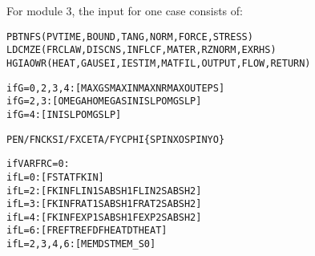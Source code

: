 \documentclass[12pt]{report}
\renewcommand{\magenta}[1]{}
\begin{document}
For module 3, the input for one case consists of:
\begin{alltt}\small
% Control integers, see section \ref{sec:controldigits}:

\magenta{ } PBTNFS      \magenta{        }       (PVTIME, BOUND , TANG  , NORM  , FORCE , STRESS)
\magenta{ } LDCMZE\magenta{  \{M\}   }             (FRCLAW, DISCNS, INFLCF, MATER , RZNORM, EXRHS \magenta{,
                                                                      MATER2})
\magenta{X}HGIAOWR     (\magenta{XFLOW , }HEAT  , GAUSEI, IESTIM, MATFIL, OUTPUT, FLOW  , RETURN)

\magenta{% Parameters for additional debug output

if X=1: [ PSFLCIN \{R\} ] (PROFIL, SMOOTH, FORCE, LOCATE, CPATCH, INFLCF, NMDBG,
                                                                        READLN)

}% Parameters for the iterative solution algorithms (section \ref{sec:iter_const}):

if G=0,2,3,4: [ MAXGS   MAXIN   MAXNR   MAXOUT  EPS     ]
if G=2,3:     [ OMEGAH  OMEGAS  INISLP  OMGSLP          ]
if G=4:       [ INISLP  OMGSLP                          ]
\magenta{if G=5:       [ FDECAY  BETATH  KDOWFB  D\_IFC   D\_LIN   D\_CNS   D\_SLP   POW\_S ]
}
% Kinematics description (section \ref{sec:kincns}):
% Note: PEN  is needed when N=0,      FN when N=1
%       CKSI is needed when F=0,      FX when F=1 or 2
%       CETA is needed when F=0 or 1, FY when F=2

PEN/FN  CKSI/FX  CETA/FY  CPHI   \{SPINXO   SPINYO\}

% Friction description (section \ref{sec:fric_dscrp}):
%      L=0 --> Coulomb friction with static/kinetic coefficients
%      L=2 --> velocity dependent friction with linear/const formula
%      L=3 --> velocity dependent friction with rational formula
%      L=4 --> velocity dependent friction with exponential formula
%      L=6 --> temperature dependent friction with piecewise linear formula

if VARFRC=0:
      if L=0: [ FSTAT  FKIN                                ]
      if L=2: [ FKIN   FLIN1  SABSH1  FLIN2  SABSH2        ]
      if L=3: [ FKIN   FRAT1  SABSH1  FRAT2  SABSH2        ]
      if L=4: [ FKIN   FEXP1  SABSH1  FEXP2  SABSH2        ]
      if L=6: [ FREF   TREF   DFHEAT  DTHEAT               ]
if L=2,3,4,6: [ MEMDST MEM\_S0                              ]

% Information needed for influence coefficients,
% particularly the rolling direction and step size (section \ref{sec:kincns}),
% and the geometry/material configuration (section \ref{sec:matcns}):


\end{alltt}
\end{document}
